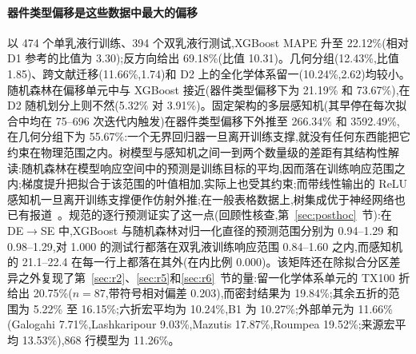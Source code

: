 \documentclass[11pt,a4paper]{ctexart}
\begin{document}
\begin{table}[t]
\centering\small
\caption{方法矩阵基准。每种适用域得分与对照的相对误差风险—覆盖曲线 AURC(越低越好),XGBoost,各重复的均值;粗体标出每个单元中的最佳项。}
\label{tab:w3aurc}
\end{table}

\paragraph{器件类型偏移是这些数据中最大的偏移} 以 474 个单乳液行训练、394 个双乳液行测试,XGBoost MAPE 升至 22.12\%(相对 D1 参考的比值为 3.30);反方向给出 69.18\%(比值 10.31)。几何分组(12.43\%,比值 1.85)、跨文献迁移(11.66\%,1.74)和 D2 上的全化学体系留一(10.24\%,2.62)均较小。随机森林在偏移单元中与 XGBoost 接近(器件类型偏移下为 21.19\% 和 73.67\%),在 D2 随机划分上则不然(5.32\% 对 3.91\%)。固定架构的多层感知机(其早停在每次拟合中均在 75–696 次迭代内触发)在器件类型偏移下外推至 266.34\% 和 3592.49\%,在几何分组下为 55.67\%:一个无界回归器一旦离开训练支撑,就没有任何东西能把它约束在物理范围之内。树模型与感知机之间一到两个数量级的差距有其结构性解读:随机森林在模型响应空间中的预测是训练目标的平均,因而落在训练响应范围之内;梯度提升把拟合于该范围的叶值相加,实际上也受其约束;而带线性输出的 ReLU 感知机一旦离开训练支撑便作仿射外推;在一般表格数据上,树集成优于神经网络也已有报道~\cite{grinsztajn2022}。规范的逐行预测证实了这一点(回顾性核查,第~\ref{sec:posthoc}~节):在 DE$\to$SE 中,XGBoost 与随机森林对归一化直径的预测范围分别为 0.94--1.29 和 0.98--1.29,对 1.000 的测试行都落在双乳液训练响应范围 0.84--1.60 之内,而感知机的 21.1--22.4 在每一行上都落在其外(在内比例 0.000)。该矩阵还在除拟合分区差异之外复现了第~\ref{sec:r2}、\ref{sec:r5}和\ref{sec:r6}~节的量:留一化学体系单元的 TX100 折给出 20.75\%($n=87$,带符号相对偏差 0.203),而密封结果为 19.84\%;其余五折的范围为 5.22\% 至 16.15\%;六折宏平均为 10.24\%,B1 为 10.27\%;外部单元为 11.66\%(Galogahi 7.71\%,Lashkaripour 9.03\%,Mazutis 17.87\%,Roumpea 19.52\%;来源宏平均 13.53\%),868 行模型为 11.26\%。
\end{document}
